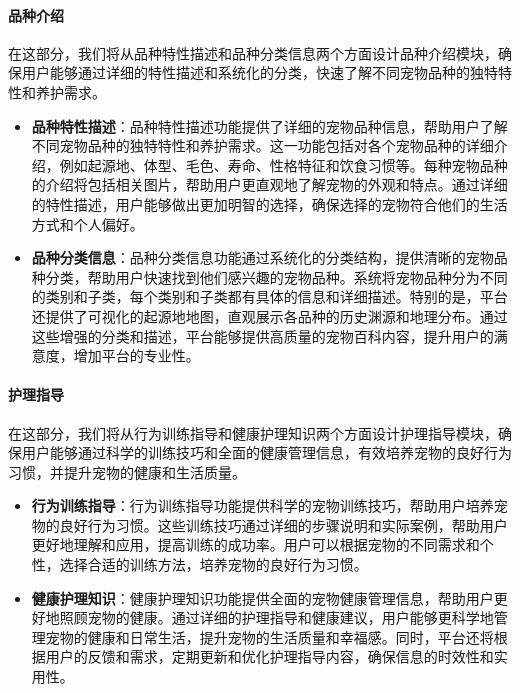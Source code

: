 \paragraph{品种介绍}

在这部分，我们将从品种特性描述和品种分类信息两个方面设计品种介绍模块，确保用户能够通过详细的特性描述和系统化的分类，快速了解不同宠物品种的独特特性和养护需求。

\begin{itemize}
	\item \textbf{品种特性描述}：品种特性描述功能提供了详细的宠物品种信息，帮助用户了解不同宠物品种的独特特性和养护需求。这一功能包括对各个宠物品种的详细介绍，例如起源地、体型、毛色、寿命、性格特征和饮食习惯等。每种宠物品种的介绍将包括相关图片，帮助用户更直观地了解宠物的外观和特点。通过详细的特性描述，用户能够做出更加明智的选择，确保选择的宠物符合他们的生活方式和个人偏好。
	\item \textbf{品种分类信息}：品种分类信息功能通过系统化的分类结构，提供清晰的宠物品种分类，帮助用户快速找到他们感兴趣的宠物品种。系统将宠物品种分为不同的类别和子类，每个类别和子类都有具体的信息和详细描述。特别的是，平台还提供了可视化的起源地地图，直观展示各品种的历史渊源和地理分布。通过这些增强的分类和描述，平台能够提供高质量的宠物百科内容，提升用户的满意度，增加平台的专业性。
\end{itemize}

\paragraph{护理指导}

在这部分，我们将从行为训练指导和健康护理知识两个方面设计护理指导模块，确保用户能够通过科学的训练技巧和全面的健康管理信息，有效培养宠物的良好行为习惯，并提升宠物的健康和生活质量。

\begin{itemize}
	\item \textbf{行为训练指导}：行为训练指导功能提供科学的宠物训练技巧，帮助用户培养宠物的良好行为习惯。这些训练技巧通过详细的步骤说明和实际案例，帮助用户更好地理解和应用，提高训练的成功率。用户可以根据宠物的不同需求和个性，选择合适的训练方法，培养宠物的良好行为习惯。
	\item \textbf{健康护理知识}：健康护理知识功能提供全面的宠物健康管理信息，帮助用户更好地照顾宠物的健康。通过详细的护理指导和健康建议，用户能够更科学地管理宠物的健康和日常生活，提升宠物的生活质量和幸福感。同时，平台还将根据用户的反馈和需求，定期更新和优化护理指导内容，确保信息的时效性和实用性。
\end{itemize}

